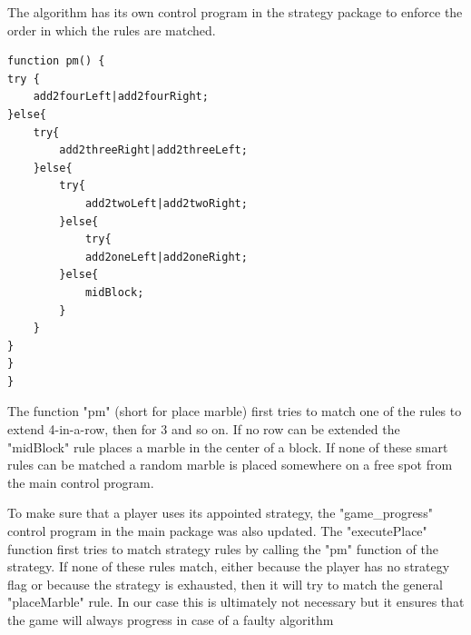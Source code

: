 The algorithm  has its own control program in the strategy package to enforce the order in which the rules are matched.

\begin{lstlisting}
function pm() {
try {
	add2fourLeft|add2fourRight;
}else{
	try{
		add2threeRight|add2threeLeft;
	}else{
		try{
			add2twoLeft|add2twoRight;
		}else{
			try{
			add2oneLeft|add2oneRight;
		}else{
			midBlock;
		}
	}
}
}
}
\end{lstlisting}
The function "pm" (short for place marble) first tries to match one of the rules to extend 4-in-a-row, then for 3 and so on. If no row can be extended the "midBlock" rule  places a marble in the center of a block. If none of these smart rules can be matched a random marble is placed somewhere on a free spot from the main control program.

\vspace{6pt}

To make sure that a player uses its appointed strategy, the "game\_progress" control program in the main package was also updated.
The "executePlace" function first tries to match strategy rules by calling the "pm" function of the strategy. If none of these rules match, either because the player has no strategy flag or because the strategy is exhausted, then it will try to match the general "placeMarble" rule. 
In our case this is ultimately not necessary but it ensures that the game will always progress in case of a faulty algorithm

